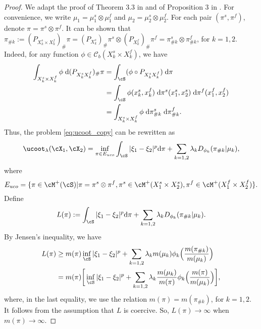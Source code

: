 \begin{proof}
  We adapt the proof of Theorem 3.3 in \citep{Liero18} and of Proposition 3 in \citep{Sejourne20}.
  For convenience, we write $\mu_1 = \mu_1^s \otimes \mu_1^f$ and
  $\mu_2 = \mu_2^s \otimes \mu_2^f$. For each pair $(\pi^s, \pi^f)$, denote
  $\pi = \pi^s \otimes \pi^f$.
  It can be shown that
  $\pi_{\# k} := (P_{X_k^s \times X_k^f})_{\#} \pi
  = (P_{X_k^s})_{\#} \pi^s \otimes (P_{X_k^f})_{\#} \pi^f =
  \pi^s_{\# k} \otimes \pi^f_{\# k}$, for $k=1,2$. Indeed, for any function
  $\phi \in \mathcal C_b(X_k^s \times X_k^f)$, we have
    \begin{equation*}
      \begin{split}
        \int_{X_k^s \times X_k^f} \phi \;
        \mathrm d (P_{X_k^s X_k^f})_{\#} \pi
        &= \int_{\cS} (\phi \circ P_{X_k^s X_k^f}) \; \mathrm d\pi \\
        &= \int_{\cS} \phi(x_k^s, x_k^f)
        \; \mathrm d \pi^s(x_1^s, x_2^s) \; \mathrm d \pi^f(x_1^f, x_2^f) \\
        &= \int_{X_k^s \times X_k^f} \phi \; \mathrm d \pi^s_{\# k} \;
        \mathrm d \pi^f_{\# k}.
      \end{split}
    \end{equation*}
  Thus, the problem \ref{eq:ucoot_copy} can be rewritten as
  \begin{equation*}
    \ucoot_{\lambda}(\cX_1, \cX_2) =
    \inf_{\pi \in E_{uco}} \int_{\cS} \vert \xi_1 - \xi_2 \vert^p
    \mathrm d\pi + \sum_{k=1,2} \lambda_k D_{\phi_k}(\pi_{\# k} \vert \mu_k),
  \end{equation*}
  where
  \begin{equation*}
    E_{uco} = \{ \pi \in \cM^+(\cS) \vert \pi = \pi^s \otimes \pi^f,
    \pi^s \in \cM^+(X_1^s \times X_2^s),
    \pi^f \in \cM^+(X_1^f \times X_2^f) \}.
  \end{equation*}
  Define
  \begin{equation*}
    L(\pi):= \int_{\cS} \vert \xi_1 - \xi_2 \vert^p \mathrm d \pi +
    \sum_{k=1,2} \lambda_k D_{\phi_k}(\pi_{\# k} \vert \mu_k).
  \end{equation*}
  By Jensen's inequality, we have
  \begin{equation*}
    \begin{split}
      L(\pi) &\geq m(\pi) \inf_{\cS} \vert \xi_1 - \xi_2 \vert^p +
      \sum_{k=1,2} \lambda_k m(\mu_k) \phi_k \Big( \frac{m(\pi_{\# k})}{m(\mu_k)} \Big) \\
      &= m(\pi) \bigg[ \inf_{\cS} \vert \xi_1 - \xi_2 \vert^p +
      \sum_{k=1,2} \lambda_k \frac{m(\mu_k)}{m(\pi)} \phi_k
      \Big( \frac{m(\pi)}{m(\mu_k)} \Big) \bigg],
    \end{split}
  \end{equation*}
  where, in the last equality, we use the relation $m(\pi) = m(\pi_{\# k})$, for $k=1,2$.
  It follows from the assumption that $L$ is coercive. So, $L(\pi) \to \infty$
  when $m(\pi) \to \infty$.


\end{proof}
